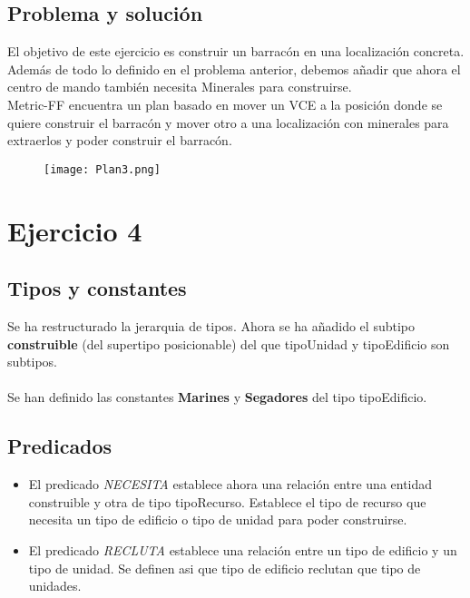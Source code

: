 \subsection{Problema y solución}
El objetivo de este ejercicio es construir un barracón en una localización concreta.\\
Además de todo lo definido en el problema anterior, debemos añadir que ahora el centro de mando también necesita Minerales para construirse.\\
Metric-FF encuentra un plan basado en mover un VCE a la posición donde se quiere construir el barracón y mover otro a una localización con minerales para extraerlos y poder construir el barracón.
\begin{figure}[H]
   \centering
   \texttt{[image: Plan3.png]}
\end{figure}


\section{Ejercicio 4}

\subsection{Tipos y constantes}
Se ha restructurado la jerarquia de tipos. Ahora se ha añadido el subtipo \textbf{construible} (del supertipo posicionable) del que tipoUnidad y tipoEdificio son subtipos.
\\\\
Se han definido las constantes \textbf{Marines} y \textbf{Segadores} del tipo tipoEdificio.
\subsection{Predicados}
\begin{itemize}
   \item El predicado \textit{NECESITA} establece ahora una relación entre una entidad construible y otra de tipo tipoRecurso. Establece el tipo de recurso que necesita un tipo de edificio o tipo de unidad para poder construirse.
   \item El predicado \textit{RECLUTA} establece una relación entre un tipo de edificio y un tipo de unidad. Se definen asi que tipo de edificio reclutan que tipo de unidades.
\end{itemize}
